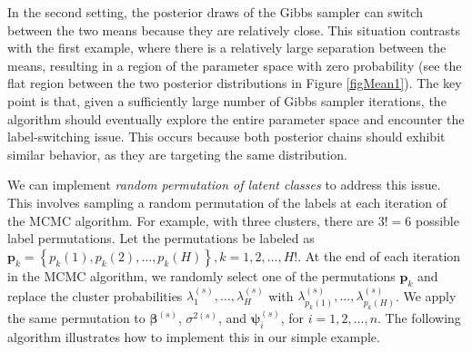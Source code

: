 In the second setting, the posterior draws of the Gibbs sampler can switch between the two means because they are relatively close. This situation contrasts with the first example, where there is a relatively large separation between the means, resulting in a region of the parameter space with zero probability (see the flat region between the two posterior distributions in Figure \ref{figMean1}). The key point is that, given a sufficiently large number of Gibbs sampler iterations, the algorithm should eventually explore the entire parameter space and encounter the label-switching issue. This occurs because both posterior chains should exhibit similar behavior, as they are targeting the same distribution. 

We can implement \textit{random permutation of latent classes} to address this issue. This involves sampling a random permutation of the labels at each iteration of the MCMC algorithm. For example, with three clusters, there are $3! = 6$ possible label permutations. Let the permutations be labeled as $\boldsymbol{p}_k=\left\{p_k(1),p_k(2),\dots,p_k(H)\right\}, k=1,2,\dots,H!$. At the end of each iteration in the MCMC algorithm, we randomly select one of the permutations $\boldsymbol{p}_k$ and replace the cluster probabilities $\lambda_1^{(s)},\dots,\lambda_H^{(s)}$ with $\lambda_{p_k(1)}^{(s)},\dots,\lambda_{p_k(H)}^{(s)}$. We apply the same permutation to $\boldsymbol{\beta}^{(s)}$, $\sigma^{2(s)}$, and $\boldsymbol{\psi}_{i}^{(s)}$, for $i=1,2,\dots,n$. The following algorithm illustrates how to implement this in our simple example.

